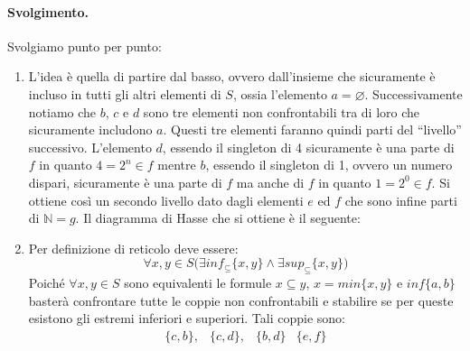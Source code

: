 \paragraph{Svolgimento.} Svolgiamo punto per punto:
\begin{enumerate}
	\item L'idea è quella di partire dal basso, ovvero dall'insieme che sicuramente è incluso in tutti gli altri elementi di $S$, ossia l'elemento $a= \varnothing$. Successivamente notiamo che $b$, $c$ e $d$ sono tre elementi non confrontabili tra di loro che sicuramente includono $a$. Questi tre elementi faranno quindi parti del ``livello'' successivo. L'elemento $d$, essendo il singleton di 4 sicuramente è una parte di $f$ in quanto $4=2^{n} \in f$ mentre $b$, essendo il singleton di 1, ovvero un numero dispari, sicuramente è una parte di $f$ ma anche di $f$ in quanto $1=2^{0} \in f$. Si ottiene così un secondo livello dato dagli elementi $e$ ed $f$ che sono infine parti di $\mathbb{N}=g$. Il diagramma di Hasse che si ottiene è il seguente:
	\begin{center}
	\end{center}
	\item Per definizione di reticolo deve essere:
	\begin{displaymath}
		\forall x,y \in S \bigl( \exists inf_{\subseteq}\{x,y\} \land \exists sup_{\subseteq} \{x,y\}\bigr)
	\end{displaymath}
	Poiché $\forall x,y \in S$ sono equivalenti le formule $x \subseteq y$, $x = min \{x,y\}$ e $inf \{a,b\}$ basterà confrontare tutte le coppie non confrontabili e stabilire se per queste esistono gli estremi inferiori e superiori. Tali coppie sono:
	\begin{displaymath}
		\begin{array}{llll}
			\{c,b\}, & \{c,d\}, & \{b,d\} & \{e,f\}

\end{array}
\end{displaymath}
\end{enumerate}
